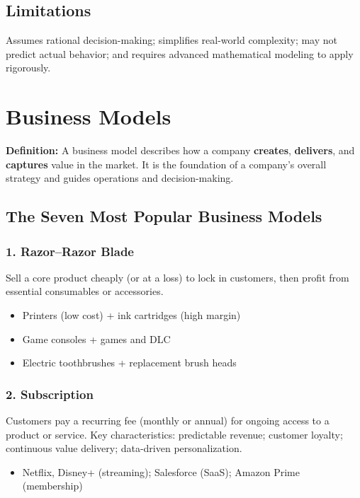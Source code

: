 \documentclass[11pt, letterpaper]{article}
\begin{document}
\subsection{Limitations}

Assumes rational decision-making; simplifies real-world complexity; may not predict actual behavior; and requires advanced mathematical modeling to apply rigorously.

\newpage

\section{Business Models}

\begin{defbox}
\textbf{Definition:} A business model describes how a company \textbf{creates}, \textbf{delivers}, and \textbf{captures} value in the market. It is the foundation of a company's overall strategy and guides operations and decision-making.
\end{defbox}

\subsection{The Seven Most Popular Business Models}

\subsubsection{1. Razor--Razor Blade}
Sell a core product cheaply (or at a loss) to lock in customers, then profit from essential consumables or accessories.
\begin{itemize}[leftmargin=*]
  \item Printers (low cost) + ink cartridges (high margin)
  \item Game consoles + games and DLC
  \item Electric toothbrushes + replacement brush heads
\end{itemize}

\subsubsection{2. Subscription}
Customers pay a recurring fee (monthly or annual) for ongoing access to a product or service.
Key characteristics: predictable revenue; customer loyalty; continuous value delivery; data-driven personalization.
\begin{itemize}[leftmargin=*]
  \item Netflix, Disney+ (streaming); Salesforce (SaaS); Amazon Prime (membership)
\end{itemize}
\end{document}
